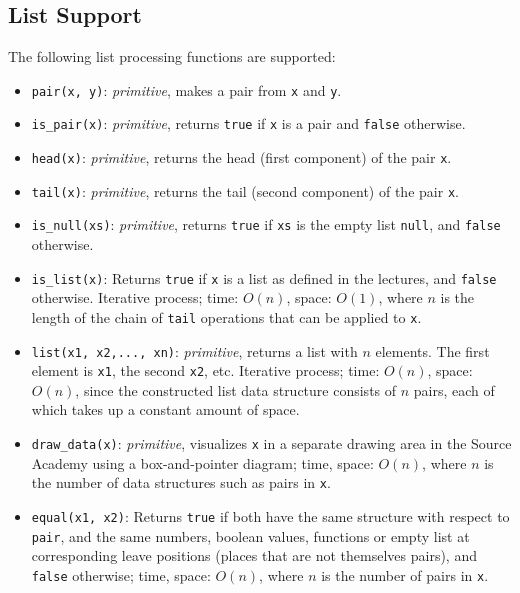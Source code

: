 \subsection*{List Support}

The following list processing functions are supported:

\begin{itemize}
\item \lstinline{pair(x, y)}: \textit{primitive}, makes a pair from \lstinline{x} and \lstinline{y}.
\item \lstinline{is_pair(x)}: \textit{primitive}, returns \lstinline{true} if \lstinline{x} is a
  pair and \lstinline{false} otherwise.
\item \lstinline{head(x)}: \textit{primitive}, returns the head (first component) of the pair \lstinline{x}.
\item \lstinline{tail(x)}: \textit{primitive}, returns the tail (second component) of the
  pair \lstinline{x}.
\item \lstinline{is_null(xs)}: \textit{primitive}, returns \lstinline{true} if \lstinline{xs} is the
  empty list \lstinline{null}, and \lstinline{false} otherwise.
\item \lstinline{is_list(x)}: Returns \lstinline{true} if
  \lstinline{x} is a list as defined in the lectures, and
  \lstinline{false} otherwise. Iterative process; 
time: $O(n)$, space: $O(1)$, where $n$ is the length of the 
chain of \lstinline{tail} operations that can be applied to \lstinline{x}.
\item \lstinline{list(x1, x2,..., xn)}: \textit{primitive}, returns a list with $n$ elements. The
first element is \lstinline{x1}, the second \lstinline{x2}, etc. Iterative
process; time: $O(n)$, space: $O(n)$, since the constructed list data structure
consists of $n$ pairs, each of which takes up a constant amount of space.
\item \lstinline{draw_data(x)}: \textit{primitive}, visualizes \lstinline{x} in a separate drawing
  area in the Source Academy using a box-and-pointer diagram; time, space:
  $O(n)$, where $n$ is the number of data structures such as
  pairs in \lstinline{x}.
\item \lstinline{equal(x1, x2)}: Returns \lstinline{true} if both
  have the same structure with respect to \lstinline{pair},
  and the same numbers, boolean values, functions or empty list
  at corresponding leave positions (places that are not themselves pairs),
  and \lstinline{false} otherwise; time, space:
  $O(n)$, where $n$ is the number of pairs in \lstinline{x}.

\end{itemize}
